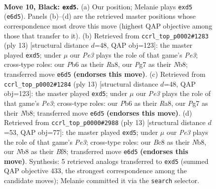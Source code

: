 \documentclass[11pt]{article}
\begin{document}
\clearpage

\begin{figure}[p]\centering
\begin{subfigure}{0.46\textwidth}\centering
\resizebox{\linewidth}{!}{%
\newchessgame
\chessboard[
  setfen={rnbq1rk1/p4pp1/1p2pn2/3P3p/Pb1P3P/2NB1N2/1P3PP1/R1BQK2R b KQ - 0 10},
  showmover=false,
  pgfstyle=straightmove, color=movearrow, markmove={e6-d5}
]}
\caption{}
\end{subfigure}\hfill
\begin{subfigure}{0.46\textwidth}\centering
\resizebox{\linewidth}{!}{%
\newchessgame
\chessboard[
  setfen={rnbq1rk1/pp3ppp/4pn2/2pP4/1b1P4/2NBPN2/PP3PPP/R1BQK2R b KQ - 0 7},
  showmover=false,
  pgfstyle=straightmove, color=movearrow, markmove={e6-d5}
]}
\caption{}
\end{subfigure}
\\[4pt]
\begin{subfigure}{0.46\textwidth}\centering
\resizebox{\linewidth}{!}{%
\newchessgame
\chessboard[
  setfen={rnbq1rk1/pp3ppp/4pn2/2pP4/1b1P4/2NBPN2/PP3PPP/R1BQK2R b KQ - 0 7},
  showmover=false,
  pgfstyle=straightmove, color=movearrow, markmove={e6-d5}
]}
\caption{}
\end{subfigure}\hfill
\begin{subfigure}{0.46\textwidth}\centering
\resizebox{\linewidth}{!}{%
\newchessgame
\chessboard[
  setfen={rn1qkb1r/pbp2p1p/1p2pnp1/3P4/3P4/2NBPN2/PP3PPP/R1BQK2R b KQkq - 0 7},
  showmover=false,
  pgfstyle=straightmove, color=movearrow, markmove={e6-d5}
]}
\caption{}
\end{subfigure}
\caption{\textbf{Move 10, Black: \texttt{exd5}.} (a) Our position; Melanie plays \texttt{exd5} (\texttt{e6d5}). Panels (b)--(d) are the retrieved master positions whose correspondence most drove this move (highest QAP objective among those that transfer to it). (b) Retrieved from \texttt{ccrl\_top\_p0002\#1283} (ply 13) [structural distance $d$=48, QAP obj=123]: the master played \texttt{exd5}; under $\mu$ our \emph{Pe3} plays the role of that game's \emph{Pe3}; cross-type roles: our \emph{P}b6 as their \emph{R}a8, our \emph{P}g7 as their \emph{N}b8; transferred move \texttt{e6d5} \textbf{(endorses this move)}. (c) Retrieved from \texttt{ccrl\_top\_p0002\#1284} (ply 13) [structural distance $d$=48, QAP obj=123]: the master played \texttt{exd5}; under $\mu$ our \emph{Pe3} plays the role of that game's \emph{Pe3}; cross-type roles: our \emph{P}b6 as their \emph{R}a8, our \emph{P}g7 as their \emph{N}b8; transferred move \texttt{e6d5} \textbf{(endorses this move)}. (d) Retrieved from \texttt{ccrl\_top\_p0000\#2988} (ply 13) [structural distance $d$=53, QAP obj=77]: the master played \texttt{exd5}; under $\mu$ our \emph{Pe3} plays the role of that game's \emph{Pe3}; cross-type roles: our \emph{B}c8 as their \emph{N}b8, our \emph{N}b8 as their \emph{B}f8; transferred move \texttt{e6d5} \textbf{(endorses this move)}. Synthesis: 5 retrieved analogs transferred to \texttt{exd5} (summed QAP objective 433, the strongest correspondence among the candidate moves); Melanie committed it via the \texttt{search} selector.}
\label{fig:thought-m19}
\end{figure}
\end{document}
